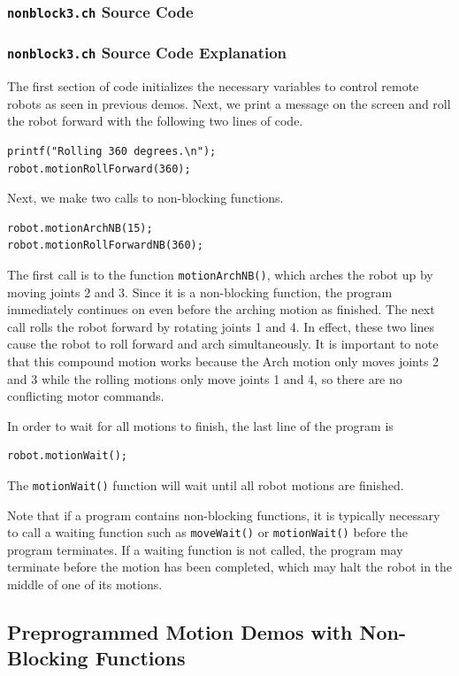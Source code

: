 \documentclass{article}
\begin{document}
\subsubsection{\texttt{nonblock3.ch} Source Code}

\subsubsection{\texttt{nonblock3.ch} Source Code Explanation}
The first section of code initializes the necessary variables to control remote
robots as seen in previous demos. Next, we print a message on the screen and 
roll the robot forward with the following two lines of code.
\begin{verbatim}
printf("Rolling 360 degrees.\n");
robot.motionRollForward(360);
\end{verbatim}
Next, we make two calls to non-blocking functions.
\begin{verbatim}
robot.motionArchNB(15);
robot.motionRollForwardNB(360);
\end{verbatim}
The first call is to the function \texttt{motionArchNB()}, which arches the robot
up by moving joints 2 and 3. Since it is a non-blocking function, the program
immediately continues on even before the arching motion as finished. The
next call rolls the robot forward by rotating joints 1 and 4. In effect, these
two lines cause the robot to roll forward and arch simultaneously. It is important
to note that this compound motion works because the Arch motion only moves 
joints 2 and 3 while the rolling motions only move joints 1 and 4, so there are
no conflicting motor commands.

In order to wait for all motions to finish, the last line of the program is
\begin{verbatim}
robot.motionWait();
\end{verbatim}
The \texttt{motionWait()} function will wait until all robot motions are finished.

Note that
if a program contains non-blocking functions, it is typically necessary to 
call a waiting function such as \texttt{moveWait()} or \texttt{motionWait()}
before the program terminates. If a waiting function is not called, the program
may terminate before the motion has been completed, which may halt the robot
in the middle of one of its motions.

\subsection{Preprogrammed Motion Demos with Non-Blocking Functions}
\end{document}
